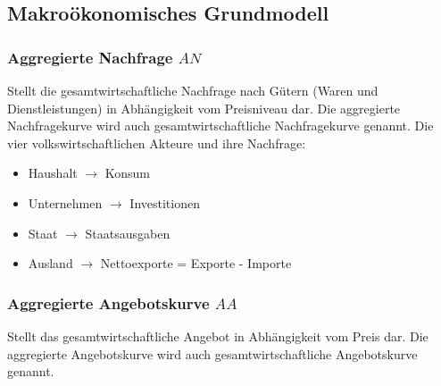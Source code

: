 \subsection{Makroökonomisches Grundmodell}
\begin{multicols}{2}
\subsubsection{Aggregierte Nachfrage $AN$}
Stellt die gesamtwirtschaftliche Nachfrage nach Gütern (Waren und Dienstleistungen) in Abhängigkeit vom Preisniveau dar. Die aggregierte Nachfragekurve wird auch gesamtwirtschaftliche Nachfragekurve genannt.
Die vier volkswirtschaftlichen Akteure und ihre Nachfrage:
\begin{itemize}
	\item Haushalt $\rightarrow$ Konsum
	\item Unternehmen $\rightarrow$ Investitionen
	\item Staat $\rightarrow$ Staatsausgaben
	\item Ausland $\rightarrow$ Nettoexporte = Exporte - Importe	
\end{itemize}
\columnbreak
\subsubsection{Aggregierte Angebotskurve $AA$}
Stellt das gesamtwirtschaftliche Angebot in Abhängigkeit vom Preis dar. Die aggregierte Angebotskurve wird auch gesamtwirtschaftliche Angebotskurve genannt.
\end{multicols}


